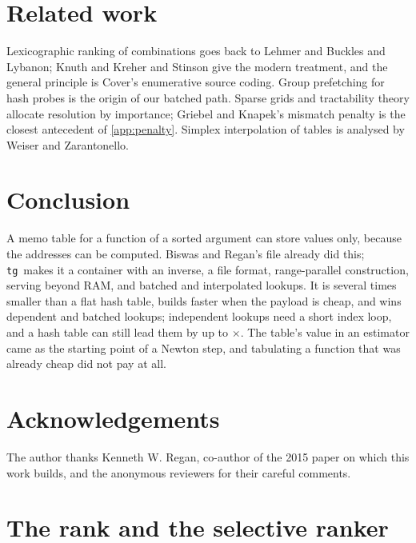 \documentclass[preprint,12pt]{elsarticle}
\newcommand{\tgl}{\texttt{tg}}
\begin{document}
\section{Related work}\label{sec:related}
Lexicographic ranking of combinations goes back to Lehmer\cite{lehmer1964} and
Buckles and Lybanon;\cite{buckles1977} Knuth\cite{knuth2011} and Kreher and Stinson\cite{kreher1999} give the modern treatment, and the general principle is Cover's enumerative
source coding.\cite{cover1973}
Group prefetching for hash probes\cite{chen2007} is the origin of our batched path.
Sparse grids\cite{bungartz2004} and tractability theory\cite{novak2008} allocate
resolution by importance; Griebel and Knapek's mismatch
penalty\cite{griebel2000} is the closest antecedent of \ref{app:penalty}. Simplex
interpolation of tables is analysed by Weiser and Zarantonello.\cite{weiser1988}

\section{Conclusion}\label{sec:conclusion}
A memo table for a function of a sorted argument can store values only, because the
addresses can be computed. Biswas and Regan's file already did this; \tgl\ makes it a
container with an inverse, a file format, range-parallel construction, serving beyond
RAM, and batched and interpolated lookups. It is several times smaller than a flat hash table, builds faster when the payload is cheap, and wins dependent and batched lookups; independent lookups need a short index loop, and a hash table can still lead them by up to \hAllIndWorst$\times$.
The table's value in an estimator came as the starting point of a Newton step, and
tabulating a function that was already cheap did not pay at all. 

\section*{Acknowledgements}
The author thanks Kenneth W. Regan, co-author of the 2015 paper on which this
work builds, and the anonymous reviewers for their careful comments.

\appendix

\section{The rank and the selective ranker}\label{app:rank}
\end{document}
